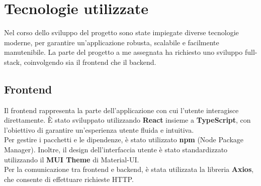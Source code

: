 \chapter{Tecnologie utilizzate}
Nel corso dello sviluppo del progetto sono state impiegate diverse tecnologie 
moderne, per garantire un'applicazione robusta, scalabile e facilmente manutenibile. 
La parte del progetto a me assegnata ha richiesto uno sviluppo full-stack, 
coinvolgendo sia il frontend che il backend.

\section{Frontend} 
Il frontend rappresenta la parte dell'applicazione con cui l'utente interagisce direttamente. 
È stato sviluppato utilizzando \textbf{React} insieme a \textbf{TypeScript}, 
con l'obiettivo di garantire un'esperienza utente fluida e intuitiva.
\\
Per gestire i pacchetti e le dipendenze, è stato utilizzato \textbf{npm} (Node Package Manager).
Inoltre, il design dell'interfaccia utente è stato standardizzato 
utilizzando il \textbf{MUI Theme} di Material-UI.
\\
Per la comunicazione tra frontend e backend, è stata utilizzata la libreria \textbf{Axios}, 
che consente di effettuare richieste HTTP.



